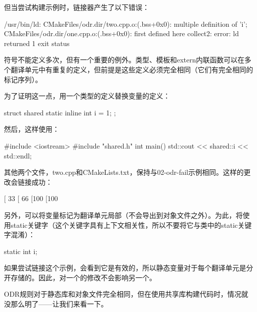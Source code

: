 但当尝试构建示例时，链接器产生了以下错误：

\begin{shell}
/usr/bin/ld:
CMakeFiles/odr.dir/two.cpp.o:(.bss+0x0): multiple definition of 'i';
CMakeFiles/odr.dir/one.cpp.o:(.bss+0x0): first defined here
collect2: error: ld returned 1 exit status
\end{shell}

符号不能定义多次，但有一个重要的例外。类型、模板和extern内联函数可以在多个翻译单元中有重复的定义，但前提是这些定义必须完全相同（它们有完全相同的标记序列）。

为了证明这一点，用一个类型的定义替换变量的定义：


\begin{cpp}
struct shared {
    static inline int i = 1;
};
\end{cpp}

然后，这样使用：


\begin{cpp}
#include <iostream>
#include "shared.h"
int main() {
    std::cout << shared::i << std::endl;
}
\end{cpp}

其他两个文件，two.cpp和CMakeLists.txt，保持与02-odr-fail示例相同。这样的更改会链接成功：

\begin{shell}
[ 33%
[ 66%
[100%
[100%
\end{shell}

另外，可以将变量标记为翻译单元局部（不会导出到对象文件之外）。为此，将使用static关键字（这个关键字具有上下文相关性，所以不要将它与类中的static关键字混淆）：


\begin{cpp}
static int i;
\end{cpp}

如果尝试链接这个示例，会看到它是有效的，所以静态变量对于每个翻译单元是分开存储的。因此，对一个的修改不会影响另一个。

ODR规则对于静态库和对象文件完全相同，但在使用共享库构建代码时，情况就没那么明了——让我们来看一下。


